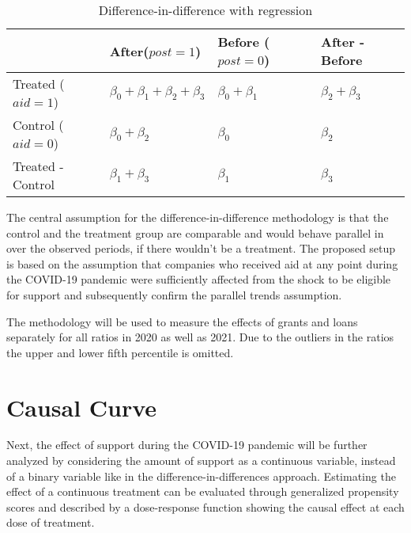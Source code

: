 \begin{table}%
\caption{Difference-in-difference with regression}
\label{tab:DiDcoefficient}
\centering
\def\arraystretch{1.5}

\begin{tabular}{l|l|l|l|}
    \cline{2-4}
                                            & After($post=1$) & Before ($post=0$)& After - Before \\ \hline
    \multicolumn{1}{|l|}{Treated ($aid=1$)}           &  $\beta_{0}+\beta_{1}+\beta_{2}+\beta_{3}$     &  $\beta_{0}+\beta_{1}$      &   $\beta_{2}+\beta_{3}$             \\ \hline
    \multicolumn{1}{|l|}{Control ($aid=0$)}           &  $\beta_{0}+\beta_{2}$     &  $\beta_{0}$      &   $\beta_{2}$             \\ \hline
    \multicolumn{1}{|l|}{Treated - Control} &  $\beta_{1}+\beta_{3}$     &  $\beta_{1}$      &   $\beta_{3}$             \\ \hline
    \end{tabular}

\end{table}

The central assumption for the difference-in-difference methodology is that the control and the treatment group are comparable and would behave parallel in over the observed periods, if there wouldn't be a treatment. The proposed setup is based on the assumption that companies who received aid at any point during the COVID-19 pandemic were sufficiently affected from the shock to be eligible for support and subsequently confirm the parallel trends assumption.

The methodology will be used to measure the effects of grants and loans separately for all ratios in 2020 as well as 2021. Due to the outliers in the ratios the upper and lower fifth percentile is omitted. 








\section{Causal Curve}

Next, the effect of support during the COVID-19 pandemic will be further analyzed by considering the amount of support as a continuous variable, instead of a binary variable like in the difference-in-differences approach. Estimating the effect of a continuous treatment can be evaluated through generalized propensity scores and described by a dose-response function showing the causal effect at each dose of treatment. 

